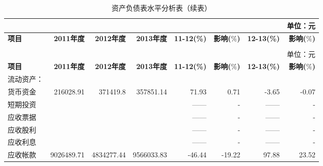\renewcommand*{\arraystretch}{0.8}
\setlength{\tabcolsep}{5pt}
\begin{longtable}{>{\scriptsize}p{9em}>{\scriptsize}r>{\scriptsize}r>{\scriptsize}r>{\scriptsize}r>{\scriptsize}r>{\scriptsize}r>{\scriptsize}r}
\caption[资产负债表分析表]{资产负债表水平分析表}\\  %
&&&&&&& {\scriptsize 单位：元}\\
\hline\hline
\rowcolor{mycyan}	\hspace{3em} \bfseries 项目 	& \bfseries 2011年度\hspace{1em} & \bfseries 2012年度\hspace{1em} 	& \bfseries 2013年度\hspace{1em} &  \bfseries  11-12(\%)  & {\bfseries \scriptsize 影响($\%$)}    & \hspace{1em} \bfseries  12-13(\%) & {\bfseries \scriptsize 影响($\%$)} \\  \endfirsthead          %
\caption[]{资产负债表水平分析表（续表）} \\ 
&&&&&&& {\scriptsize 单位：元}\\                        %
\hline\hline
\rowcolor{mycyan}	\hspace{3em} \bfseries 项目 	& \bfseries 2011年度\hspace{1em} & \bfseries 2012年度\hspace{1em} 	& \bfseries 2013年度\hspace{1em} &  \bfseries  11-12(\%)  & {\bfseries \scriptsize 影响($\%$)}    & \hspace{1em} \bfseries  12-13(\%) & {\bfseries \scriptsize 影响($\%$)} \\  \endhead                %
\hline
\endfoot
\hline   %
	流动资产：	&		&		&		&		&		&		&		\\
\hspace{2ex}	    货币资金	&	216028.91	&	371419.8	&	357851.14	&	71.93	&	0.71	&	-3.65	&	-0.07	\\
\hspace{2ex}	    短期投资	&		&		&		&	——	&	- 	&	——	&	- 	\\
\hspace{2ex}	    应收票据	&		&		&		&	——	&	- 	&	——	&	- 	\\
\hspace{2ex}	    应收股利	&		&		&		&	——	&	- 	&	——	&	- 	\\
\hspace{2ex}	    应收利息	&		&		&		&	——	&	- 	&	——	&	- 	\\
\hspace{2ex}	    应收帐款	&	9026489.71	&	4834277.44	&	9566033.83	&	-46.44	&	-19.22	&	97.88	&	23.52	\\

\end{longtable}
